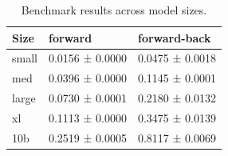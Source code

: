 \begin{table}
\caption{Benchmark results across model sizes.}
\label{tab:model-benchmark-results}
\begin{tabular}{lll}
\toprule
Size & forward & forward-back \\
\midrule
small & 0.0156 ± 0.0000 & 0.0475 ± 0.0018 \\
med & 0.0396 ± 0.0000 & 0.1145 ± 0.0001 \\
large & 0.0730 ± 0.0001 & 0.2180 ± 0.0132 \\
xl & 0.1113 ± 0.0000 & 0.3475 ± 0.0139 \\
10b & 0.2519 ± 0.0005 & 0.8117 ± 0.0069 \\
\bottomrule
\end{tabular}
\end{table}
